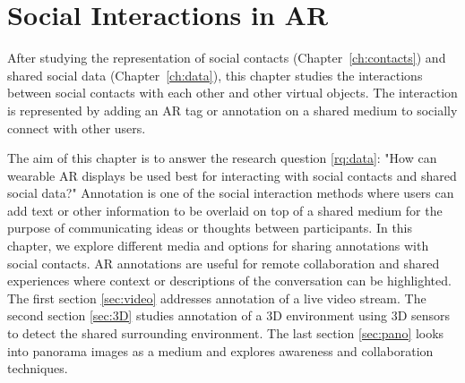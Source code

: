 \chapter{Social Interactions in AR}
\label{ch:annotation}

After studying the representation of social contacts (Chapter~\ref{ch:contacts}) and shared social data (Chapter~\ref{ch:data}), this chapter studies the interactions between social contacts with each other and other virtual objects. The interaction is represented by adding an AR tag or annotation on a shared medium to socially connect with other users.

The aim of this chapter is to answer the research question \ref{rq:data}: "How can wearable AR displays be used best for interacting with social contacts and shared social data?"
Annotation is one of the social interaction methods where users can add text or other information to be overlaid on top of a shared medium for the purpose of communicating ideas or thoughts between participants. In this chapter, we explore different media and options for sharing annotations with social contacts. AR annotations are useful for remote collaboration and shared experiences where context or descriptions of the conversation can be highlighted.  
The first section \ref{sec:video} addresses annotation of a live video stream. The second section \ref{sec:3D} studies annotation of a 3D environment using 3D sensors to detect the shared surrounding environment. The last section \ref{sec:pano} looks into panorama images as a medium and explores awareness and collaboration techniques. 





